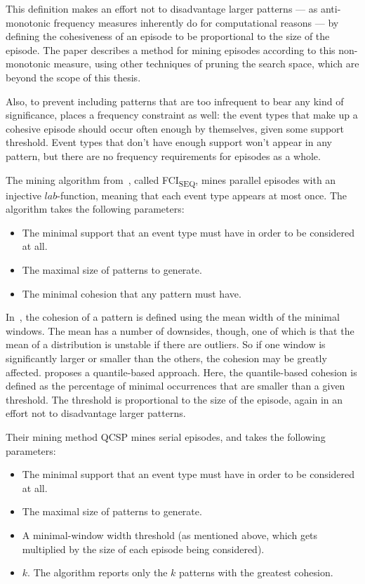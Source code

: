 This definition makes an effort not to disadvantage larger patterns --- as anti-monotonic frequency measures inherently do for computational reasons --- by defining the cohesiveness of an episode to be proportional to the size of the episode. The paper describes a method for mining episodes according to this non-monotonic measure, using other techniques of pruning the search space, which are beyond the scope of this thesis.

Also, to prevent including patterns that are too infrequent to bear any kind of significance, \cite{cule2016efficient} places a frequency constraint as well: the event types that make up a cohesive episode should occur often enough by themselves, given some support threshold. Event types that don't have enough support won't appear in any pattern, but there are no frequency requirements for episodes as a whole.

The mining algorithm from~\cite{cule2016efficient}, called FCI\textsubscript{SEQ}, mines parallel episodes with an injective $ lab $-function, meaning that each event type appears at most once. The algorithm takes the following parameters:
\begin{itemize}
\item The minimal support that an event type must have in order to be considered at all.
\item The maximal size of patterns to generate.
\item The minimal cohesion that any pattern must have.
\end{itemize}

In~\cite{cule2016efficient}, the cohesion of a pattern is defined using the mean width of the minimal windows. The mean has a number of downsides, though, one of which is that the mean of a distribution is unstable if there are outliers. So if one window is significantly larger or smaller than the others, the cohesion may be greatly affected. \citep{feremans2018mining} proposes a quantile-based approach. Here, the quantile-based cohesion is defined as the percentage of minimal occurrences that are smaller than a given threshold. The threshold is proportional to the size of the episode, again in an effort not to disadvantage larger patterns.

Their mining method QCSP mines serial episodes, and takes the following parameters:
\begin{itemize}
\item The minimal support that an event type must have in order to be considered at all.
\item The maximal size of patterns to generate.
\item A minimal-window width threshold (as mentioned above, which gets multiplied by the size of each episode being considered).
\item $ k $. The algorithm reports only the $ k $ patterns with the greatest cohesion.
\end{itemize}

